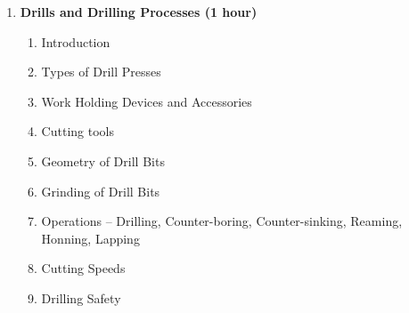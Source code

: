 \begin{enumerate}
    
    \item \textbf{Drills and Drilling Processes \hfill (1 hour)}
    \begin{enumerate}
        \item Introduction
        \item Types of Drill Presses
        \item Work Holding Devices and Accessories
        \item Cutting tools
        \item Geometry of Drill Bits
        \item Grinding of Drill Bits
        \item Operations -- Drilling, Counter-boring, Counter-sinking, Reaming, Honning, Lapping
        \item Cutting Speeds
        \item Drilling Safety
    \end{enumerate}
    

\end{enumerate}
